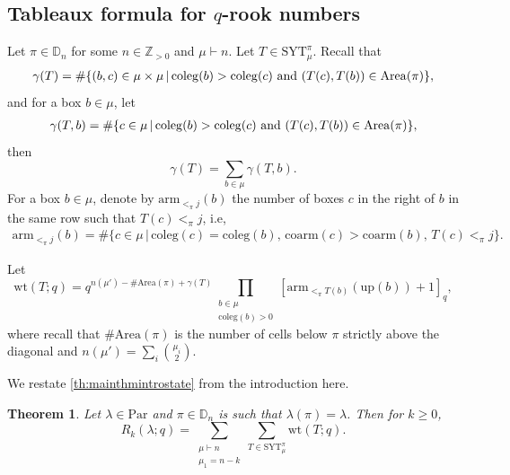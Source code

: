 \documentclass[12pt,reqno]{amsart}
\theoremstyle{plain}
\newtheorem{theorem}{Theorem}[section]
\theoremstyle{definition}
\theoremstyle{remark}
\theoremstyle{example}
\numberwithin{equation}{section}
\newcommand\ZZ{\mathbb{Z}}
\newcommand\Par{\mathrm{Par}}
\newcommand\up{\mathrm{up}}
\newcommand\arm{\mathrm{arm}}
\newcommand{\coleg}{\mathrm{coleg}}
\newcommand{\SYT}{\mathrm{SYT}}
\newcommand{\wt}{\mathrm{wt}}
\newcommand{\Area}{\mathrm{Area}}
\newcommand{\DD}{\mathbb{D}}
\begin{document}
\subsection{Tableaux formula for $q$-rook numbers}\label{sec:tabformulanots}

Let $\pi \in \DD_n$ for some $n \in \ZZ_{>0}$ and $\mu \vdash n$. Let $T \in \SYT^\pi_\mu$. Recall that \begin{align}
	\gamma(T) = \#\{(b,c) \in \mu\times \mu\,|\, \coleg(b)>\coleg(c) \hbox{ and } (T(c),T(b)) \in \Area(\pi) \},
\end{align} and for a box $b \in \mu$, let \begin{align}
	\gamma(T,b) = \#\{ c \in \mu\,|\, \coleg(b)>\coleg(c) \hbox{ and } (T(c),T(b)) \in \Area(\pi) \}, 
\end{align} then $$ \gamma(T) = \sum_{b \in \mu}\gamma(T,b).$$ For a box $b \in \mu$, denote by $\arm_{<_\pi j}(b)$ the number of boxes $c$ in the right of $b$ in the same row such that $T(c) <_\pi j$, i.e, \begin{align}
	\arm_{<_\pi j}(b) = \# \{ c \in \mu\,|\, \coleg(c) = \coleg(b) ,\, \mathrm{coarm}(c) > \mathrm{coarm}(b) ,\, T(c) <_\pi j \}.
\end{align} 

Let \begin{equation}\label{eq:wtdef}
	\wt(T;q) =  q^{n(\mu')-\# \Area(\pi) + \gamma(T)} \prod_{\substack{b \in \mu \\ \coleg(b)>0}} [\arm_{<_\pi T(b)}(\up(b))+1]_q,
\end{equation} where recall that $\# \Area(\pi)$ is the number of cells below $\pi$ strictly above the diagonal and $n(\mu') = \sum_{i} \binom{\mu_i}{2}$.

We restate \autoref{th:mainthmintrostate} from the introduction here.
\begin{theorem}\label{th:rooktableauformula}
	Let $\lambda \in \Par$ and $\pi \in \DD_n$ is such that $\lambda(\pi) = \lambda$. Then for $k \geq 0$, \begin{equation}\label{eq:R_k=sumwt}
		R_k(\lambda;q) = \sum_{\substack{\mu \vdash n \\ \mu_1 = n-k}} \sum_{T \in \SYT^\pi_\mu} \wt(T;q).
	\end{equation}
\end{theorem}
\end{document}
